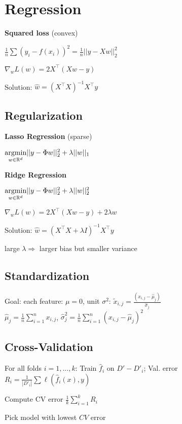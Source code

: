 \section*{Regression}

\textbf{Squared loss} \quad (convex)

\qquad \qquad $\frac{1}{n}\sum (y_i - f(x_i))^2 = \frac{1}{n}||y - X w||_2^2$

\qquad \qquad $\nabla_w L(w) = 2X^\top(Xw -y)$

Solution: $\hat{w} = (X^\top X)^{-1}X^\top y$

\subsection*{Regularization}

\textbf{Lasso Regression} \quad (sparse)

\qquad \qquad $\underset{w \in \mathbb{R}^d}{\text{argmin}} ||y - \Phi w||_2^2 + \lambda ||w||_1$

\textbf{Ridge Regression}

\qquad \qquad $\underset{w \in \mathbb{R}^d}{\text{argmin}} ||y - \Phi w||_2^2 + \lambda ||w||_2^2$

\qquad \qquad $\nabla_w L(w) = 2X^\top(Xw -y) + 2 \lambda w$

Solution: $\hat w = (X^\top X + \lambda I)^{-1} X^\top y$

large $\lambda \Rightarrow$ larger bias but smaller variance 

\subsection*{Standardization}
Goal: each feature: $\mu = 0$, unit $\sigma^2$: $\tilde{x}_{i,j} = \frac{(x_{i,j}-\hat{\mu}_j)}{\hat{\sigma}_j}$\\
$\hat{\mu}_j = \frac{1}{n}\sum_{i=1}^n x_{i,j}$, $\hat{\sigma}_j^2 = \frac{1}{n}\sum_{i=1}^n {(x_{i,j}-\hat{\mu}_j)}^2$ 

\subsection*{Cross-Validation}

\begin{rowlist}
	\item For all folds $i = 1,..., k$:  Train $\hat{f}_i$ on $D' - D'_i$; Val. error $R_i = \frac{1}{|D'_i|} \sum \ell(\hat{f}_i(x), y)$
	\item Compute CV error $\frac{1}{k} \sum_{i=1}^k R_i$
	\item Pick model with lowest $CV$ error
\end{rowlist}